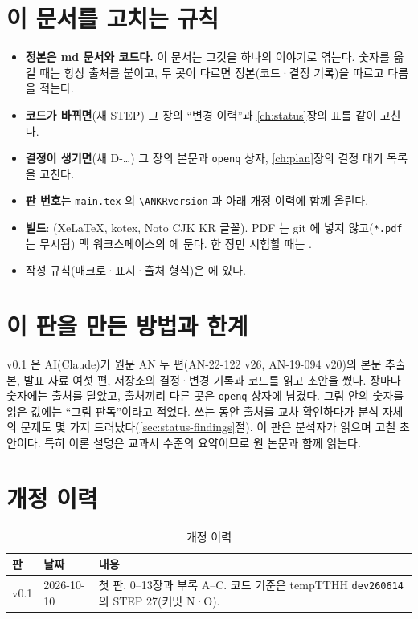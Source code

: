 \section{이 문서를 고치는 규칙}\label{sec:about-maintenance}

\begin{itemize}
\item \textbf{정본은 md 문서와 코드다.} 이 문서는 그것을 하나의 이야기로 엮는다. 숫자를 옮길 때는 항상 출처를 붙이고, 두 곳이 다르면 정본(코드·결정 기록)을 따르고 다름을 적는다.
\item \textbf{코드가 바뀌면}(새 STEP) 그 장의 ``변경 이력''과 \ref{ch:status}장의 표를 같이 고친다.
\item \textbf{결정이 생기면}(새 D-…) 그 장의 본문과 \texttt{openq} 상자, \ref{ch:plan}장의 결정 대기 목록을 고친다.
\item \textbf{판 번호}는 \texttt{main.tex} 의 \texttt{\textbackslash ANKRversion} 과 아래 개정 이력에 함께 올린다.
\item \textbf{빌드}: (XeLaTeX, kotex, Noto CJK KR 글꼴). PDF 는 git 에 넣지 않고(\texttt{*.pdf} 는 무시됨)
맥 워크스페이스의  에 둔다. 한 장만 시험할 때는 .
\item 작성 규칙(매크로·표지·출처 형식)은  에 있다.
\end{itemize}

\section{이 판을 만든 방법과 한계}\label{sec:about-howmade}

v0.1 은 AI(Claude)가 원문 AN 두 편(AN-22-122 v26, AN-19-094 v20)의 본문 추출본, 발표 자료 여섯 편, 저장소의 결정·변경 기록과 코드를
읽고 초안을 썼다. 장마다 숫자에는 출처를 달았고, 출처끼리 다른 곳은 \texttt{openq} 상자에 남겼다. 그림 안의 숫자를 읽은 값에는
``그림 판독''이라고 적었다. 쓰는 동안 출처를 교차 확인하다가 분석 자체의 문제도 몇 가지 드러났다(\ref{sec:status-findings}절).
이 판은 분석자가 읽으며 고칠 초안이다. 특히 이론 설명은 교과서 수준의 요약이므로 원 논문과 함께 읽는다.

\section{개정 이력}\label{sec:about-history}

\begin{table}[htbp]\centering
\caption{개정 이력}\label{tab:about-history}
\small
\begin{tabularx}{\linewidth}{@{}l l L@{}}
\toprule
판 & 날짜 & 내용 \\
\midrule
v0.1 & 2026-10-10 & 첫 판. 0–13장과 부록 A–C. 코드 기준은 tempTTHH \texttt{dev260614} 의 STEP 27(커밋 N·O). \\
\bottomrule
\end{tabularx}
\end{table}
